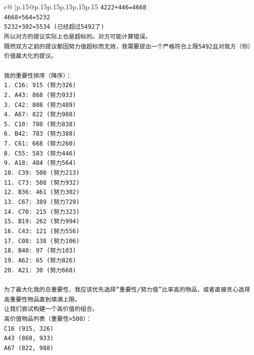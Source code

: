 \documentclass{article}
\begin{document}
{\begin{supertabular}{c@{$\;$}|p{.15\linewidth}@{}p{.15\linewidth}p{.15\linewidth}p{.15\linewidth}p{.15\linewidth}p{.15\linewidth}}
{{{\texttt{4222+446=4668} \\
\texttt{4668+564=5232} \\
\texttt{5232+302=5534 (已经超过5492了)} \\
\texttt{所以对方的提议实际上也是超标的。对方可能计算错误。} \\
\texttt{既然双方之前的提议都因努力值超标而无效，我需要提出一个严格符合上限5492且对我方（你）价值最大化的提议。} \\
\\ 
\texttt{我的重要性排序（降序）：} \\
\texttt{1. C16: 915 (努力326)} \\
\texttt{2. A43: 868 (努力933)} \\
\texttt{3. C42: 808 (努力489)} \\
\texttt{4. A67: 822 (努力988)} \\
\texttt{5. C10: 780 (努力838)} \\
\texttt{6. B42: 783 (努力388)} \\
\texttt{7. C61: 668 (努力260)} \\
\texttt{8. C55: 583 (努力446)} \\
\texttt{9. A18: 484 (努力564)} \\
\texttt{10. C39: 500 (努力213)} \\
\texttt{11. C73: 508 (努力932)} \\
\texttt{12. B36: 461 (努力302)} \\
\texttt{13. C67: 389 (努力729)} \\
\texttt{14. C70: 215 (努力323)} \\
\texttt{15. B19: 262 (努力994)} \\
\texttt{16. C43: 121 (努力556)} \\
\texttt{17. C08: 138 (努力106)} \\
\texttt{18. B40: 97 (努力103)} \\
\texttt{19. A62: 65 (努力826)} \\
\texttt{20. A21: 30 (努力668)} \\
\\ 
\texttt{为了最大化我的总重要性，我应该优先选择“重要性/努力值”比率高的物品，或者直接贪心选择高重要性物品直到填满上限。} \\
\texttt{让我们尝试构建一个高价值的组合。} \\
\texttt{高价值物品列表（重要性>500）：} \\
\texttt{C16 (915, 326)} \\
\texttt{A43 (868, 933)} \\
\texttt{A67 (822, 988)} \\
}}}
\end{supertabular}}
\end{document}
